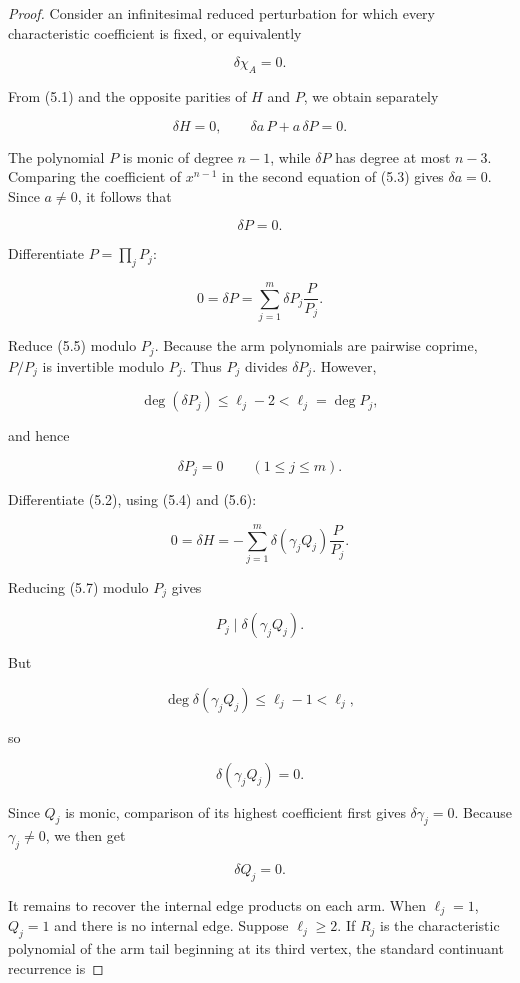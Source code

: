 \documentclass[11pt]{article}
\theoremstyle{remark}
\begin{document}
\begin{proof}

Consider an infinitesimal reduced perturbation for which every characteristic coefficient is fixed, or equivalently

\[
\delta\chi_A=0.
\]

From (5.1) and the opposite parities of $H$ and $P$, we obtain separately

\[
\delta H=0,
\qquad
\delta a\,P+a\,\delta P=0.
\tag{5.3}
\]

The polynomial $P$ is monic of degree $n-1$, while $\delta P$ has degree at most $n-3$. Comparing the coefficient of $x^{n-1}$ in the second equation of (5.3) gives $\delta a=0$. Since $a\ne0$, it follows that

\[
\delta P=0.
\tag{5.4}
\]

Differentiate $P=\prod_jP_j$:

\[
0=\delta P
=\sum_{j=1}^m
\delta P_j\frac{P}{P_j}.
\tag{5.5}
\]

Reduce (5.5) modulo $P_j$. Because the arm polynomials are pairwise coprime, $P/P_j$ is invertible modulo $P_j$. Thus $P_j$ divides $\delta P_j$. However,

\[
\deg(\delta P_j)\le \ell_j-2<\ell_j=\deg P_j,
\]

and hence

\[
\delta P_j=0
\qquad (1\le j\le m).
\tag{5.6}
\]

Differentiate (5.2), using (5.4) and (5.6):

\[
0=\delta H
=-\sum_{j=1}^m
\delta(\gamma_jQ_j)\frac{P}{P_j}.
\tag{5.7}
\]

Reducing (5.7) modulo $P_j$ gives

\[
P_j\mid \delta(\gamma_jQ_j).
\]

But

\[
\deg\delta(\gamma_jQ_j)\le \ell_j-1<\ell_j,
\]

so

\[
\delta(\gamma_jQ_j)=0.
\]

Since $Q_j$ is monic, comparison of its highest coefficient first gives $\delta\gamma_j=0$. Because $\gamma_j\ne0$, we then get

\[
\delta Q_j=0.
\tag{5.8}
\]

It remains to recover the internal edge products on each arm. When $\ell_j=1$, $Q_j=1$ and there is no internal edge. Suppose $\ell_j\ge2$. If $R_j$ is the characteristic polynomial of the arm tail beginning at its third vertex, the standard continuant recurrence \cite{ref4,ref5} is


\end{proof}
\end{document}
